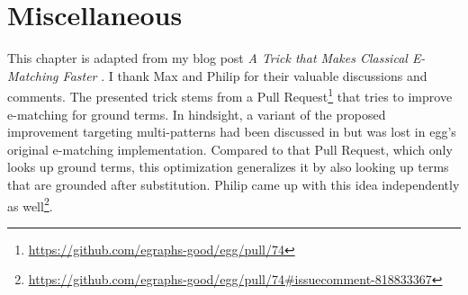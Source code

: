 \section{Miscellaneous}\label{miscellaneous}

This chapter is adapted 
 from my blog post 
 \textit{A Trick that Makes Classical E-Matching Faster} \citep{nonrelational-ematching-post}.
I thank Max and Philip for their valuable discussions and comments.
The presented trick stems from a Pull Request\footnote{\url{https://github.com/egraphs-good/egg/pull/74}}
 that tries to improve e-matching for ground terms.
In hindsight, 
 a variant of the proposed improvement targeting multi-patterns
 had been discussed in \citet{efficient-ematching}
 but was lost in egg's original e-matching implementation.
Compared to that Pull Request, which
 only looks up ground terms, this optimization generalizes it by also
 looking up terms that are grounded after substitution.
Philip came up with this idea independently 
 as well\footnote{\url{https://github.com/egraphs-good/egg/pull/74\#issuecomment-818833367}}.

